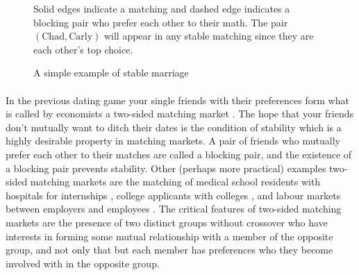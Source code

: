 \begin{figure}
\centering
{}
\caption{A simple example of stable marriage}
\small
\begin{flushleft}
Solid edges indicate a matching and dashed edge indicates a blocking pair who prefer each other to their math. The pair $(\text{Chad},\text{Carly})$ will appear in any stable matching since they are each other's top choice.
\end{flushleft}
\end{figure}

\paragraph{}
In the previous dating game your single friends with their preferences form what is called by economists a two-sided matching market \cite{roth1992two}. The hope that your friends don't mutually want to ditch their dates is the condition of stability which is a highly desirable property in matching markets. A pair of friends who mutually prefer each other to their matches are called a blocking pair, and the existence of a blocking pair prevents stability. Other (perhaps more practical) examples two-sided matching markets are the matching of medical school residents with hospitals for internships \cite{roth1996nrmp}, college applicants with colleges \cite{gale1962college}, and labour markets between employers and employees \cite{roth1992two}. The critical features of two-sided matching markets are the presence of two distinct groups without crossover who have interests in forming some mutual relationship with a member of the opposite group, and not only that but each member has preferences who they become involved with in the opposite group.
